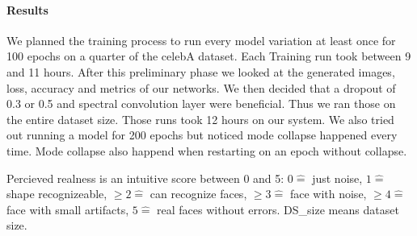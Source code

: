 \documentclass[12pt, a4paper]{article}
\begin{document}
\paragraph{Results}
We planned the training process to run every model variation at least once for 100 epochs on a quarter of the celebA dataset. Each Training run took between 9 and 11 hours. After this preliminary phase we looked at the generated images, loss, accuracy and metrics of our networks. We then decided that a dropout of 0.3 or 0.5 and spectral convolution layer were beneficial. Thus we ran those on the entire dataset size. Those runs took 12 hours on our system. We also tried out running a model for 200 epochs but noticed mode collapse happened every time. Mode collapse also happend when restarting on an epoch without collapse.

Percieved realness is an intuitive score between 0 and 5: $0\widehat{=} $ just noise, $1\widehat{=} $ shape recognizeable, $\ge 2\widehat{=} $ can recognize faces, $\ge 3\widehat{=} $ face with noise, $\ge 4\widehat{=} $ face with small artifacts, $5 \widehat{=} $ real faces without errors. DS\_size means dataset size.
\end{document}
